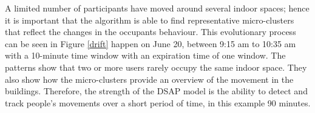 
A limited number of participants have moved around several indoor spaces; hence it is important that the algorithm is able to find representative micro-clusters that reflect the changes in the occupants behaviour. This evolutionary process can be seen in Figure \ref{drift} happen on June 20, between 9:15 am to 10:35 am with a 10-minute time window with an expiration time of one window. The patterns show that two or more users rarely occupy the same indoor space. They also show how the micro-clusters provide an overview of the movement in the buildings. Therefore, the strength of the DSAP model is the ability to detect and track people's movements over a short period of time, in this example 90 minutes.



